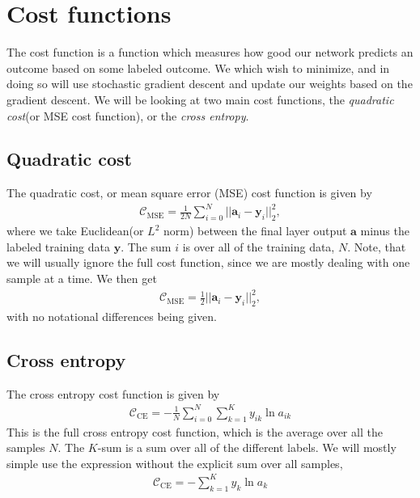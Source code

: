 \documentclass[a4paper,10pt]{article}
\begin{document}
\section{Cost functions}
The cost function is a function which measures how good our network predicts an outcome based on some labeled outcome. We which wish to minimize, and in doing so will use stochastic gradient descent and update our weights based on the gradient descent. We will be looking at two main cost functions, the \textit{quadratic cost}(or MSE cost function), or the \textit{cross entropy}.

\subsection{Quadratic cost}
The quadratic cost, or mean square error (MSE) cost function is given by
\begin{align}
    \mathcal{C}_\mathrm{MSE} = \frac{1}{2N} \sum_{i=0}^N ||\bm{a}_i - \bm{y}_i||^2_2,
    \label{eq:full-mse-cost}
\end{align}
where we take Euclidean(or $L^2$ norm) between the final layer output $\bm{a}$ minus the labeled training data $\bm{y}$. The sum $i$ is over all of the training data, $N$. Note, that we will usually ignore the full cost function, since we are mostly dealing with one sample at a time. We then get
\begin{align}
    \mathcal{C}_\mathrm{MSE} = \frac{1}{2} ||\bm{a}_i - \bm{y}_i||^2_2,
    \label{eq:mse-cost}
\end{align}
with no notational differences being given.

\subsection{Cross entropy}
The cross entropy cost function is given by
\begin{align}
    \mathcal{C}_\mathrm{CE} = - \frac{1}{N}\sum_{i=0}^{N} \sum^K_{k=1} y_{ik} \ln a_{ik}
    \label{eq:full-cross-entropy}
\end{align}
This is the full cross entropy cost function, which is the average over all the samples $N$. The $K$-sum is a sum over all of the different labels. We will mostly simple use the expression without the explicit sum over all samples,
\begin{align}
    \mathcal{C}_\mathrm{CE} = - \sum^K_{k=1} y_{k} \ln a_{k}
    \label{eq:cross-entropy}
\end{align}
\end{document}
